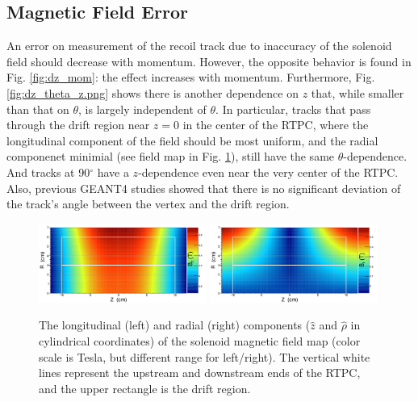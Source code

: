 \documentclass[amsmath,amssymb,notitlepage,11pt]{revtex4-1}
\begin{document}
\subsection{Magnetic Field Error}
An error on measurement of the recoil track due to inaccuracy of the solenoid field should decrease with momentum.  However, the opposite behavior is found in Fig. \ref{fig:dz_mom}: the effect increases with momentum.  Furthermore, Fig. \ref{fig:dz_theta_z.png} shows there is another dependence on $z$ that, while smaller than that on $\theta$, is largely independent of $\theta$.
In particular, tracks that pass through the drift region near $z=0$ in the center of the RTPC, where the longitudinal component of the field should be most uniform, and the radial componenet minimial (see field map in Fig. \ref{fig:field}), still have the same $\theta$-dependence.  And tracks at 90$^\circ$ have a $z$-dependence even near the very center of the RTPC.  Also, previous GEANT4 studies showed that there is no significant deviation of the track's angle between the vertex and the drift region.
\begin{figure}[htbp]\centering
    \includegraphics[width=0.49\textwidth]{pics/saclay5_longitudinal_small.png}
    \includegraphics[width=0.49\textwidth]{pics/saclay5_radial_small.png}
    \caption{The longitudinal (left) and radial (right) components ($\hat{z}$ and $\hat{\rho}$ in cylindrical coordinates) of the solenoid magnetic field map (color scale is Tesla, but different range for left/right).  The vertical white lines represent the upstream and downstream ends of the RTPC, and the upper rectangle is the drift region.\label{fig:field}}
\end{figure}
\end{document}
